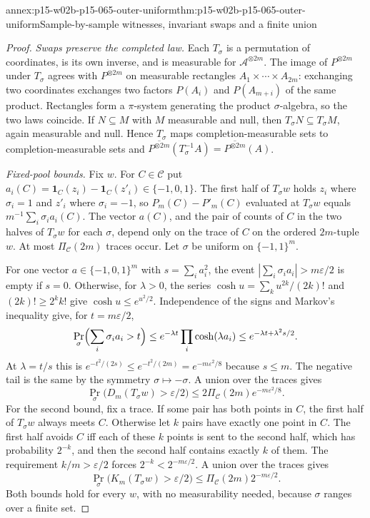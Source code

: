 \begin{annexitem}{annex:p15-w02b-p15-065-outer-uniform}{thm:p15-w02b-p15-065-outer-uniform}{Sample-by-sample witnesses, invariant swaps and a finite union}
\begin{proof}
\emph{Swaps preserve the completed law.} Each \(T_\sigma\) is a
permutation of coordinates, is its own inverse, and is measurable for
\(\mathcal A^{\otimes2m}\). The image of \(P^{\otimes2m}\) under
\(T_\sigma\) agrees with \(P^{\otimes2m}\) on measurable rectangles
\(A_1\times\cdots\times A_{2m}\): exchanging two coordinates exchanges two
factors \(P(A_i)\) and \(P(A_{m+i})\) of the same product. Rectangles form a
\(\pi\)-system generating the product \(\sigma\)-algebra, so the two laws
coincide. If \(N\subseteq M\) with \(M\) measurable and null, then
\(T_\sigma N\subseteq T_\sigma M\), again measurable and null. Hence
\(T_\sigma\) maps completion-measurable sets to completion-measurable sets
and \(\overline{P^{\otimes2m}}(T_\sigma^{-1}A)=\overline{P^{\otimes2m}}(A)\).

\emph{Fixed-pool bounds.} Fix \(w\). For \(C\in\mathcal C\) put
\(a_i(C)=\mathbf1_C(z_i)-\mathbf1_C(z'_i)\in\{-1,0,1\}\). The first half of
\(T_\sigma w\) holds \(z_i\) where \(\sigma_i=1\) and \(z'_i\) where
\(\sigma_i=-1\), so
\(P_m(C)-P'_m(C)\) evaluated at \(T_\sigma w\) equals
\(m^{-1}\sum_i\sigma_ia_i(C)\). The vector \(a(C)\), and the pair of counts
of \(C\) in the two halves of \(T_\sigma w\) for each \(\sigma\), depend
only on the trace of \(C\) on the ordered \(2m\)-tuple \(w\). At most
\(\Pi_{\mathcal C}(2m)\) traces occur. Let \(\sigma\) be uniform on
\(\{-1,1\}^m\).

For one vector \(a\in\{-1,0,1\}^m\) with \(s=\sum_ia_i^2\), the event
\(|\sum_i\sigma_ia_i|>m\varepsilon/2\) is empty if \(s=0\). Otherwise, for
\(\lambda>0\), the series \(\cosh u=\sum_ku^{2k}/(2k)!\) and
\((2k)!\geq2^kk!\) give \(\cosh u\leq e^{u^2/2}\). Independence of the signs
and Markov's inequality give, for \(t=m\varepsilon/2\),
\[
 \Pr_\sigma\Bigl(\sum_i\sigma_ia_i>t\Bigr)\leq e^{-\lambda t}\prod_i\cosh(\lambda a_i)
 \leq e^{-\lambda t+\lambda^2s/2}.
\]
At \(\lambda=t/s\) this is \(e^{-t^2/(2s)}\leq e^{-t^2/(2m)}=e^{-m\varepsilon^2/8}\)
because \(s\leq m\). The negative tail is the same by the symmetry
\(\sigma\mapsto-\sigma\). A union over the traces gives
\[
 \Pr_\sigma\bigl(D_m(T_\sigma w)>\varepsilon/2\bigr)\leq2\Pi_{\mathcal C}(2m)e^{-m\varepsilon^2/8}.
 \tag{F1}
\]
For the second bound, fix a trace. If some pair has both points in \(C\),
the first half of \(T_\sigma w\) always meets \(C\). Otherwise let \(k\)
pairs have exactly one point in \(C\). The first half avoids \(C\) iff each
of these \(k\) points is sent to the second half, which has probability
\(2^{-k}\), and then the second half contains exactly \(k\) of them. The
requirement \(k/m>\varepsilon/2\) forces \(2^{-k}<2^{-m\varepsilon/2}\).
A union over the traces gives
\[
 \Pr_\sigma\bigl(K_m(T_\sigma w)>\varepsilon/2\bigr)\leq\Pi_{\mathcal C}(2m)2^{-m\varepsilon/2}.
 \tag{F2}
\]
Both bounds hold for every \(w\), with no measurability needed, because
\(\sigma\) ranges over a finite set.


\end{proof}
\end{annexitem}

